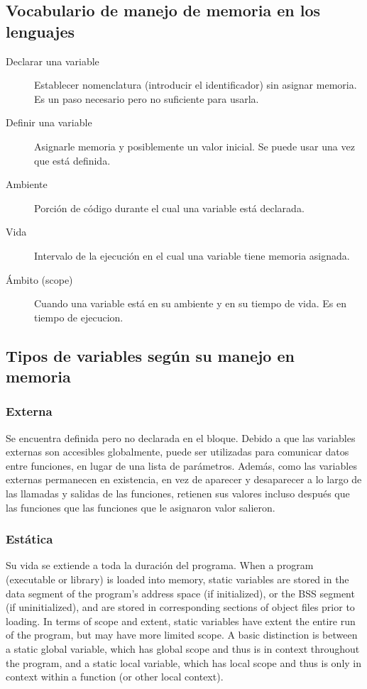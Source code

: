 \documentclass[a4paper, twoside]{article}
\begin{document}
\subsection{Vocabulario de manejo de memoria en los lenguajes}
\begin{description}
	\item[Declarar una variable] Establecer nomenclatura (introducir el identificador) sin asignar memoria. Es un paso necesario pero no suficiente para usarla.
	
	\item[Definir una variable] Asignarle memoria y posiblemente un valor inicial. Se puede usar una vez que está definida.
	
	\item[Ambiente] Porción de código durante el cual una variable está declarada.
	
	\item[Vida] Intervalo de la ejecución en el cual una variable tiene memoria asignada.
	
	\item[Ámbito (scope)] Cuando una variable está en su ambiente y en su tiempo de vida. Es en tiempo de ejecucion.
\end{description}

\subsection{Tipos de variables según su manejo en memoria}
\subsubsection{Externa}
Se encuentra definida pero no declarada en el bloque.
Debido a que las variables externas son accesibles globalmente, puede ser utilizadas para comunicar datos entre funciones, en lugar de una lista de parámetros.
Además, como las variables externas permanecen en existencia, en vez de aparecer y desaparecer a lo largo de las llamadas y salidas de las funciones, retienen sus valores incluso después que las funciones que las funciones que le asignaron valor salieron.

\subsubsection{Estática}
Su vida se extiende a toda la duración del programa.
When a program (executable or library) is loaded into memory, static variables are stored in the data segment of the program's address space (if initialized), or the BSS segment (if uninitialized), and are stored in corresponding sections of object files prior to loading.
In terms of scope and extent, static variables have extent the entire run of the program, but may have more limited scope. A basic distinction is between a static global variable, which has global scope and thus is in context throughout the program, and a static local variable, which has local scope and thus is only in context within a function (or other local context).
\end{document}
